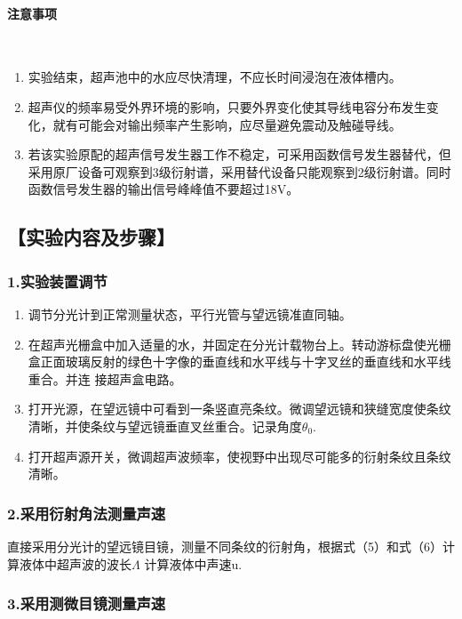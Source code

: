 \documentclass[12pt,a4paper,UTF8]{ctexart}
\begin{document}
    \paragraph{注意事项}~
    \newline
    \indent
    \begin{enumerate}[label=\arabic*.]
		\item 实验结束，超声池中的水应尽快清理，不应长时间浸泡在液体槽内。
		\item 超声仪的频率易受外界环境的影响，只要外界变化使其导线电容分布发生变化，就有可能会对输出频率产生影响，应尽量避免震动及触碰导线。
		\item 若该实验原配的超声信号发生器工作不稳定，可采用函数信号发生器替代，但采用原厂设备可观察到3级衍射谱，采用替代设备只能观察到2级衍射谱。同时函数信号发生器的输出信号峰峰值不要超过18V。
	\end{enumerate}


\subsection*{【实验内容及步骤】}

\subsubsection*{1.实验装置调节}
    \begin{enumerate}[label=\arabic*.]
		\item 调节分光计到正常测量状态，平行光管与望远镜准直同轴。
		\item 在超声光栅盒中加入适量的水，并固定在分光计载物台上。转动游标盘使光栅盒正面玻璃反射的绿色十字像的垂直线和水平线与十字叉丝的垂直线和水平线重合。并连
		接超声盒电路。
		\item 打开光源，在望远镜中可看到一条竖直亮条纹。微调望远镜和狭缝宽度使条纹清晰，并使条纹与望远镜垂直叉丝重合。记录角度$\theta_0$.
		\item 打开超声源开关，微调超声波频率，使视野中出现尽可能多的衍射条纹且条纹清晰。
	\end{enumerate}

\subsubsection*{2.采用衍射角法测量声速}

直接采用分光计的望远镜目镜，测量不同条纹的衍射角，根据式（5）和式（6）计算液体中超声波的波长$\varLambda$ 计算液体中声速u.
\subsubsection*{3.采用测微目镜测量声速}
\end{document}
